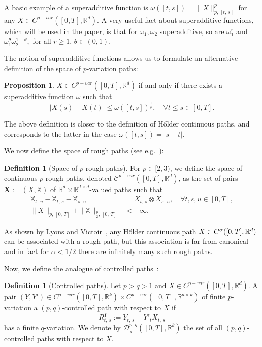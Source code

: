 \documentclass[10pt]{amsart}
\theoremstyle{definition}\newtheorem{defi}[theo]{Definition}\newtheorem{rema}[theo]{Remark}\newtheorem{exam}[theo]{Example}\newtheorem{exem}[theo]{Example}\newtheorem{nota}[theo]{Notation}
\newcommand{\bfX}{\mathbf{X}}
\newcommand{\bbX}{\mathbb{X}}
\newcommand{\calD}{\mathcal{D}}
\newcommand{\calC}{\mathcal{C}}
\newcommand{\Rr}{{\mathbb{R}}}
\newcommand*{\romanenumi}{\renewcommand*{\theenumi}{\roman{enumi}}}
\let\oldforall\forall
\renewcommand*{\forall}{\mathrel{\oldforall}}
\newtheorem*{prop*}{Proposition}
\begin{document}
A basic example of a superadditive function is $\omega([t,s])=\|X\|^p_{p,\,[t,\,s]}$ for any $X\in C^{p-var}([0,T],\Rr^d).$ A very useful fact about superadditive functions, which will be used in the paper, is that for $\omega_1, \omega_2$ superadditive, so are $\omega_1^{r}$ and $\omega_1^{\theta}\omega_2^{1-\theta},$ for all $r\geq 1,\, \theta\in (0,1).$

The notion of superadditive functions allows us to formulate an alternative definition of the space of $p$-variation paths:

\begin{prop*}
$X\in C^{p-var}([0,T],\Rr^d)$ if and only if there exists a superadditive function $\omega$ such that
\[
\left|X(s)-X(t)\right|\leq \omega([t,s])^{\frac 1 p},\quad \forall t\leq s\in[0,T].
\]
\end{prop*}

The above definition is closer to the definition of H\H older continuous paths, and corresponds to the latter in the case $\omega([t,s])=|s-t|.$


We now define the space of rough paths (see e.g.~\cite[Section~1.2.4]{FritzShekhar}):
\begin{defi}[Space of $p$-rough paths]\label{def.roughpath}
For $p\in[2, 3)$, we define the space of continuous $p$-rough paths, denoted $\calC^{p-var}([0,T], \Rr^d)$, as the set of pairs $\bfX:=(X,\bbX)$ of $\Rr^d\times\Rr^{d\times d}$-valued paths such that
\begin{align}
\tag{\rm i} \bbX_{t,\,u}-\bbX_{t,\,s}-\bbX_{s,\,u} &=X_{t,\,s}\otimes X_{s,\,u},\quad \forall t,s,u\in[0,T],\label{defi2.3.1}
\\
\tag{\rm ii}
\|X\|_{p,\,[0,\,T]}+ \|\bbX\|_{{\frac p 2},\,[0,\,T]} &<+\infty.\label{defi2.3.2}
\end{align}
\end{defi}

As shown by Lyons and Victoir~\cite{LV07}, any H\H older continuous path $X\in C^\alpha([0,T],\linebreak\Rr^d)$ can be associated with a rough path, but this association is far from canonical and in fact for $\alpha<1/2$ there are infinitely many such rough paths.


Now, we define the analogue of controlled paths~\cite[Definition~1]{gubinelli2004}:
\begin{defi}[Controlled paths]\label{chp02def:conrtollab}
Let $p>q>1$ and $X\in C^{p-var}([0,T],\Rr^d)$. A pair $(Y,Y')\in C^{p-var}([0,T],\Rr^k)\times C^{p-var}([0,T],\Rr^{d\times k})$ of finite $p$-variation a $(p, q)$-controlled path with respect to $X$ if
\[
R^Y_{t,\,s} {:=} Y_{t,\,s} - Y'_t X_{t,\,s}
\]
has a finite $q$-variation. We denote by $\calD^{p,\,q}_{_X}([0,T], \Rr^k)$ the set of all $(p, q)$-controlled paths with respect to $X$.
\end{defi}
\end{document}
